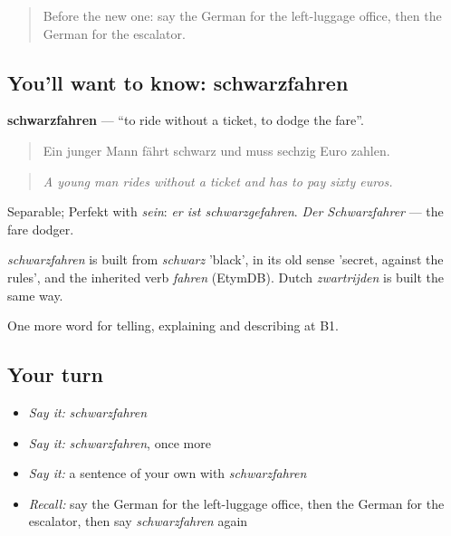 \begin{quote}
Before the new one: say the German for the left-luggage office, then the German for the escalator.
\end{quote}

\subsection*{You'll want to know: schwarzfahren}
\textbf{schwarzfahren} — \textquotedblleft{}to ride without a ticket, to dodge the fare\textquotedblright{}.

\begin{quote}
Ein junger Mann fährt schwarz und muss sechzig Euro zahlen.
\end{quote}

\begin{quote}
\emph{A young man rides without a ticket and has to pay sixty euros.}
\end{quote}

Separable; Perfekt with \emph{sein}: \emph{er ist schwarzgefahren}. \emph{Der Schwarzfahrer} — the fare dodger.

\begin{cousinweb}
\emph{schwarzfahren} is built from \emph{schwarz} 'black', in its old sense 'secret, against the rules', and the inherited verb \emph{fahren} (EtymDB). Dutch \emph{zwartrijden} is built the same way.
\end{cousinweb}

\begin{grammarlens}[title={What you've built}]
One more word for telling, explaining and describing at B1.
\end{grammarlens}

\subsection*{Your turn}
\begin{itemize}
\raggedright
  \item \emph{Say it:} \emph{schwarzfahren}
  \item \emph{Say it:} \emph{schwarzfahren}, once more
  \item \emph{Say it:} a sentence of your own with \emph{schwarzfahren}
  \item \emph{Recall:} say the German for the left-luggage office, then the German for the escalator, then say \emph{schwarzfahren} again
\end{itemize}

